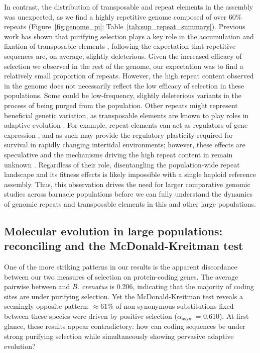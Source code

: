 In contrast, the distribution of transposable and repeat elements in the
\bgla{} assembly was unexpected, as we find a highly repetitive genome
composed of over 60\% repeats (Figure~\ref{fig:genome_pi};
Table~\ref{tab:sup_repeat_summary}).
Previous work has shown that purifying selection plays a key role in the accumulation
and fixation of transposable elements \citep{merel_relaxed_2025,langmuller_genomic_2023,
bourque_ten_2018}, following the expectation that repetitive sequences are, on average,
slightly deleterious.
Given the increased efficacy of selection we observed in the rest of the genome,
our expectation was to find a relatively small proportion of repeats.
However, the high repeat content observed in the genome does not necessarily
reflect the low efficacy of selection in these populations.
Some could be low-frequency, slightly deleterious variants in the process of being purged
from the population.
Other repeats might represent beneficial genetic variation, as transposable elements are
known to play roles in adaptive evolution \citep{schrader_impact_2019}.
For example, repeat elements can act as regulators of gene expression
\citep{trizzino_transposable_2017,rech_population-scale_2022}, and as such may provide
the regulatory plasticity required for survival in rapidly changing
intertidal environments;
however, these effects are speculative and the mechanisms driving the high repeat
content in \bgla{} remain unknown .
Regardless of their role, disentangling the population-wide repeat landscape and its
fitness effects is likely impossible with a single haploid reference assembly.
Thus, this observation drives the need for larger comparative genomic studies across
barnacle populations before we can fully understand the dynamics of genomic repeats
and transposable elements in this and other large populations.

\subsection*{Molecular evolution in large populations: reconciling \dnds{} and the
McDonald-Kreitman test}\label{sec:discussion_dnds_mkt}

One of the more striking patterns in our results is the apparent discordance between
our two measures of selection on protein-coding genes.
The average pairwise \dnds{} between \bgla{} and \textit{B. crenatus} is 0.206,
indicating that the majority of coding sites are under purifying selection.
Yet the McDonald-Kreitman test reveals a seemingly opposite pattern: $\approx61\%$
of non-synonymous substitutions fixed between these species were driven by
positive selection ($\alpha_\text{asym}$ = 0.610).
At first glance, these results appear contradictory: how can coding sequences be
under strong purifying selection while simultaneously showing pervasive adaptive
evolution?
\vspace{0.1cm}

